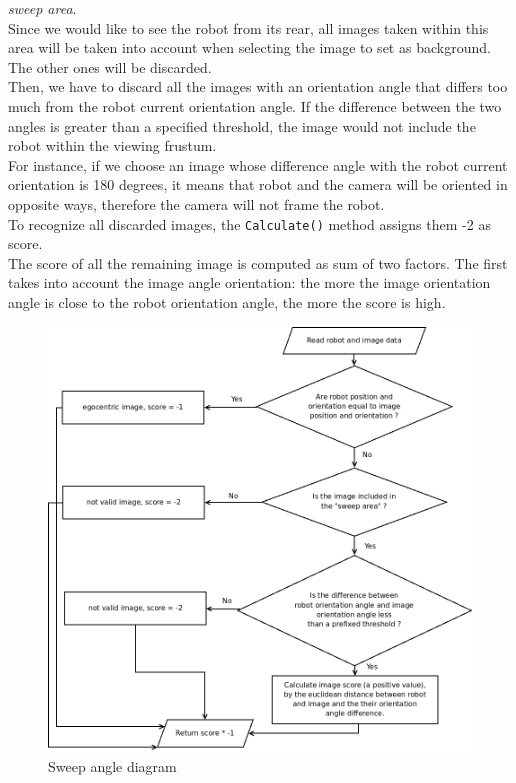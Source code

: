 \textit{sweep area}.
\\
Since we would like to see the robot from its rear, 
all images taken within this area will be taken into account
when selecting the image to set as background.
The other ones will be discarded.
\\
Then, we have to discard all the images with an orientation 
angle that differs too much from the robot current orientation angle. 
If the difference between the two angles is greater than a specified 
threshold, the image would not include the robot 
within the viewing frustum.
\\
For instance, if we choose an image whose difference angle with 
the robot current orientation is 180 degrees, it means that robot and 
the camera will be oriented in opposite ways, 
therefore the camera will not frame the robot.
\\
To recognize all discarded images, the \texttt{Calculate()} method 
assigns them -2 as score.
\\
The score of all the remaining image is computed as sum 
of two factors.
The first takes into account the image angle orientation: 
the more the image orientation angle is close to the 
robot orientation angle, the more the score is high.
\begin{figure}[!h]
  \begin{center}
    \includegraphics[width=\textwidth]{img/sweep_angle_diagram.png} 
    \caption{Sweep angle diagram}
    \label{fig:sweep_angle_diagram}
  \end{center}
\end{figure}
